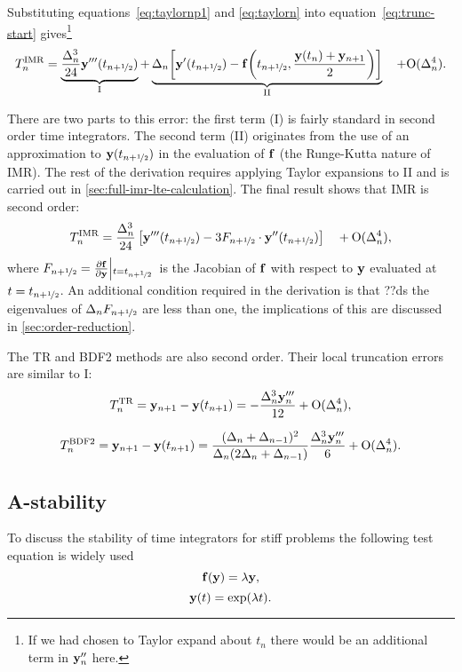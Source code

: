 Substituting equations~\eqref{eq:taylornp1} and \eqref{eq:taylorn} into equation~\eqref{eq:trunc-start} gives\footnote{If we had chosen to Taylor expand about $t_n$ there would be an additional term in $\mathbf{y}_n''$ here.}
\begin{equation}
  \lte^\imr = \underbrace{\frac{\dtn^3}{24} \yvhf[''']}_{\text{I}}
  + \underbrace{\dtn\bigs{ \yvhf['] - \ffv{\thf, \frac{\yv(t_n) + \yv_{n+1}}{2}} }}_{\text{II}}
  \porder{\dtn^4}.
  \label{eq:trunc-mid}
\end{equation}

There are two parts to this error: the first term (I) is fairly standard in second order time integrators.
The second term (II) originates from the use of an approximation to $\mathbf{y}(t_{n+\nicefrac{1}{2}})$ in the evaluation of ${\mathbf{f}}$ (\ie the Runge-Kutta nature of IMR).
The rest of the derivation requires applying Taylor expansions to II and is carried out in \autoref{sec:full-imr-lte-calculation}.
The final result shows that IMR is second order:
\begin{equation}
  \lte^\imr = \frac{\dtn^3}{24} \left[\yvhf['''] - 3 \dfdyhf \cdot \yvhf[''] \right]
  \porder{\dtn^4},
  \label{eq:trunc-final}
\end{equation}
where $F_{n+\nicefrac{1}{2}} = \frac{\partial {\mathbf{f}}}{\partial \mathbf{y}}{\left|_{t=t_{n+\nicefrac{1}{2}}}\right.}$ is the Jacobian of ${\mathbf{f}}$ with respect to $\mathbf{y}$ evaluated at $t=t_{n+\nicefrac{1}{2}}$.
An additional condition required in the derivation is that ??ds the eigenvalues of $\Delta_{n}F_{n+\nicefrac{1}{2}}$ are less than one, the implications of this are discussed in \autoref{sec:order-reduction}.

The TR\cite[261]{GreshoSani} and BDF2\cite[715]{GreshoSani} methods are also second order.
Their local truncation errors are similar to I:
\begin{equation}
  \label{eq:tr-lte}
  \lte^\tr = \yv_{n+1} - \yv(t_{n+1}) = -\frac{\dtn^3 \yv_n'''}{12}
  + \order{\dtn^4},
\end{equation}

\begin{equation}
  \label{eq:bdf2-lte}
  \lte^\bdf = \yv_{n+1} - \yv(t_{n+1}) = \frac{(\dtn + \dtx{n-1})^2}{\dtn(2\dtn + \dtx{n-1})}
  \frac{\dtn^3 \yv_n'''}{6}
  + \order{\dtn^4}.
\end{equation}


\subsection{A-stability}

To discuss the stability of time integrators for stiff problems the following test equation is widely used
\begin{equation}
  \ffv{\yv} = \lambda \yv,
  \label{eq:ode-test-f}
\end{equation}
\ie
\begin{equation}
  \mathbf{y}(t) = \exp(\lambda t).
\end{equation}

